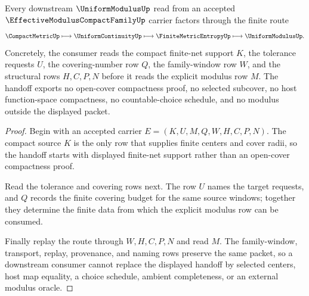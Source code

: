 \begin{theorem}
\label{thm:effective-modulus-compact-family-finite-net-handoff}
Every downstream $\UniformModulusUp$ read from an accepted $\EffectiveModulusCompactFamilyUp$ carrier factors through the finite route
$$
\CompactMetricUp
\longmapsto
\UniformContinuityUp
\longmapsto
\FiniteMetricEntropyUp
\longmapsto
\UniformModulusUp .
$$
Concretely, the consumer reads the compact finite-net support $K$, the tolerance requests $U$, the covering-number row $Q$, the family-window row $W$, and the structural rows $H,C,P,N$ before it reads the explicit modulus row $M$. The handoff exports no open-cover compactness proof, no selected subcover, no host function-space compactness, no countable-choice schedule, and no modulus outside the displayed packet.
\end{theorem}
\begin{proof}
Begin with an accepted carrier $E=(K,U,M,Q,W,H,C,P,N)$. The compact source $K$ is the only row that supplies finite centers and cover radii, so the handoff starts with displayed finite-net support rather than an open-cover compactness proof.

Read the tolerance and covering rows next. The row $U$ names the target requests, and $Q$ records the finite covering budget for the same source windows; together they determine the finite data from which the explicit modulus row can be consumed.

Finally replay the route through $W,H,C,P,N$ and read $M$. The family-window, transport, replay, provenance, and naming rows preserve the same packet, so a downstream consumer cannot replace the displayed handoff by selected centers, host map equality, a choice schedule, ambient completeness, or an external modulus oracle.
\end{proof}


